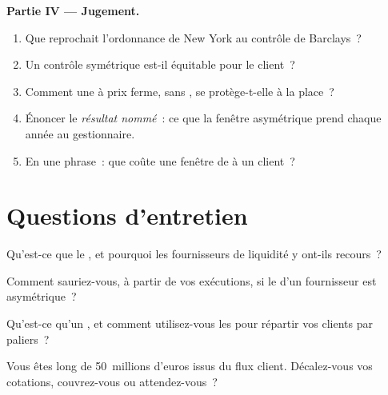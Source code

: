 \begin{problem}
\medskip\noindent\textbf{Partie IV --- Jugement.}
\begin{enumerate}[resume]
\item Que reprochait l'ordonnance de New York au contrôle de Barclays~?
\item Un contrôle symétrique est-il équitable pour le client~?
\item Comment une  à prix ferme, sans , se protège-t-elle à la place~?
\item Énoncer le \emph{résultat nommé}~: ce que la fenêtre asymétrique prend chaque année
au gestionnaire.
\item En une phrase~: que coûte une fenêtre de  à un client~?
\end{enumerate}
\end{problem}

\section{Questions d'entretien}

\begin{interviewq}\label{iq:m2:fx-spot-microstructure:1}
Qu'est-ce que le , et pourquoi les fournisseurs de liquidité y ont-ils recours~?
\end{interviewq}

\begin{interviewq}\label{iq:m2:fx-spot-microstructure:2}
Comment sauriez-vous, à partir de vos exécutions, si le  d'un fournisseur est
asymétrique~?
\end{interviewq}

\begin{interviewq}\label{iq:m2:fx-spot-microstructure:3}
Qu'est-ce qu'un , et comment utilisez-vous les  pour répartir vos clients par paliers~?
\end{interviewq}

\begin{interviewq}\label{iq:m2:fx-spot-microstructure:4}
Vous êtes long de 50~millions d'euros issus du flux client. Décalez-vous vos cotations, couvrez-vous ou attendez-vous~?
\end{interviewq}

